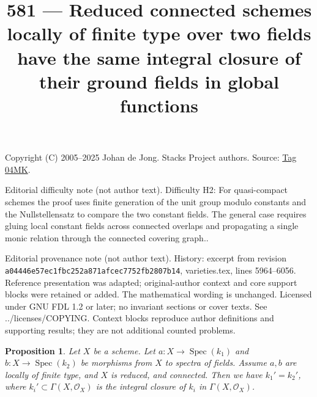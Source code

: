 \documentclass{amsart}
\theoremstyle{plain}
\newtheorem{proposition}[subsection]{Proposition}
\theoremstyle{definition}
\theoremstyle{remark}
\numberwithin{equation}{subsection}
\def\Spec{\mathop{\mathrm{Spec}}}
\begin{document}
\title[Stacks Project, Tag 04MK]{581 --- Reduced connected schemes locally of finite type over two fields have the same integral closure of their ground fields in global functions}
\maketitle
\noindent Copyright (C) 2005--2025 Johan de Jong. Stacks Project authors. Source: \href{https://stacks.math.columbia.edu/tag/04MK}{Tag 04MK}.

\noindent Editorial difficulty note (not author text). Difficulty H2: For quasi-compact schemes the proof uses finite generation of the unit group modulo constants and the Nullstellensatz to compare the two constant fields. The general case requires gluing local constant fields across connected overlaps and propagating a single monic relation through the connected covering graph..

\noindent Editorial provenance note (not author text). History: excerpt from revision \texttt{a0444\allowbreak 6e57e\allowbreak c1fbc\allowbreak 252a8\allowbreak 71afc\allowbreak ec775\allowbreak 2fb28\allowbreak 07b14}, varieties.tex, lines 5964--6056. Reference presentation was adapted; original-author context and core support blocks were retained or added. The mathematical wording is unchanged. Licensed under GNU FDL 1.2 or later; no invariant sections or cover texts. See ../licenses/COPYING. Context blocks reproduce author definitions and supporting results; they are not additional counted problems.

\begin{proposition}
\label{proposition-unique-base-field}
Let $X$ be a scheme. Let $a : X \to \Spec(k_1)$ and
$b : X \to \Spec(k_2)$ be morphisms from $X$ to spectra of fields.
Assume $a, b$ are locally of finite type, and
$X$ is reduced, and connected. Then we have
$k_1' = k_2'$, where $k_i' \subset \Gamma(X, \mathcal{O}_X)$ is
the integral closure of $k_i$ in $\Gamma(X, \mathcal{O}_X)$.
\end{proposition}
\end{document}
